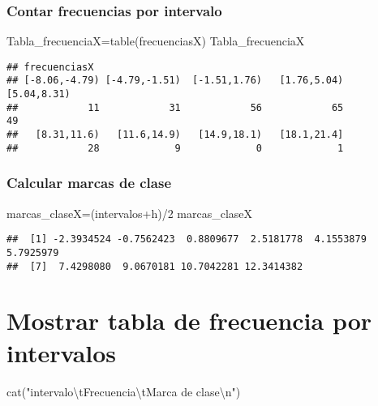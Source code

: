 \documentclass[
]{article}
\newenvironment{Shaded}{\begin{snugshade}}{\end{snugshade}}
\newcommand{\DecValTok}[1]{\textcolor[rgb]{0.00,0.00,0.81}{#1}}
\newcommand{\FunctionTok}[1]{\textcolor[rgb]{0.00,0.00,0.00}{#1}}
\newcommand{\NormalTok}[1]{#1}
\newcommand{\OtherTok}[1]{\textcolor[rgb]{0.56,0.35,0.01}{#1}}
\newcommand{\SpecialCharTok}[1]{\textcolor[rgb]{0.00,0.00,0.00}{#1}}
\newcommand{\StringTok}[1]{\textcolor[rgb]{0.31,0.60,0.02}{#1}}
\begin{document}
\hypertarget{contar-frecuencias-por-intervalo}{%
\subsubsection{Contar frecuencias por
intervalo}\label{contar-frecuencias-por-intervalo}}

\begin{Shaded}
\begin{Highlighting}[]
\NormalTok{Tabla\_frecuenciaX}\OtherTok{=}\FunctionTok{table}\NormalTok{(frecuenciasX)}
\NormalTok{Tabla\_frecuenciaX}
\end{Highlighting}
\end{Shaded}

\begin{verbatim}
## frecuenciasX
## [-8.06,-4.79) [-4.79,-1.51)  [-1.51,1.76)   [1.76,5.04)   [5.04,8.31) 
##            11            31            56            65            49 
##   [8.31,11.6)   [11.6,14.9)   [14.9,18.1)   [18.1,21.4] 
##            28             9             0             1
\end{verbatim}

\hypertarget{calcular-marcas-de-clase}{%
\subsubsection{Calcular marcas de
clase}\label{calcular-marcas-de-clase}}

\begin{Shaded}
\begin{Highlighting}[]
\NormalTok{marcas\_claseX}\OtherTok{=}\NormalTok{(intervalos}\SpecialCharTok{+}\NormalTok{h)}\SpecialCharTok{/}\DecValTok{2}
\NormalTok{marcas\_claseX}
\end{Highlighting}
\end{Shaded}

\begin{verbatim}
##  [1] -2.3934524 -0.7562423  0.8809677  2.5181778  4.1553879  5.7925979
##  [7]  7.4298080  9.0670181 10.7042281 12.3414382
\end{verbatim}

\hypertarget{mostrar-tabla-de-frecuencia-por-intervalos}{%
\section{Mostrar tabla de frecuencia por
intervalos}\label{mostrar-tabla-de-frecuencia-por-intervalos}}

\begin{Shaded}
\begin{Highlighting}[]
\FunctionTok{cat}\NormalTok{(}\StringTok{"intervalo}\SpecialCharTok{\textbackslash{}t}\StringTok{Frecuencia}\SpecialCharTok{\textbackslash{}t}\StringTok{Marca de clase}\SpecialCharTok{\textbackslash{}n}\StringTok{"}\NormalTok{) }
\end{Highlighting}
\end{Shaded}
\end{document}
